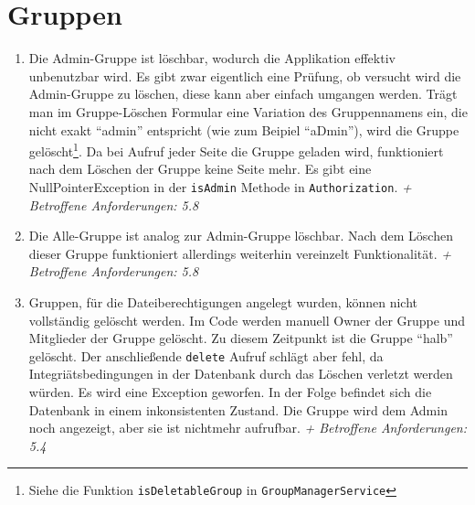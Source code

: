 \documentclass[12pt,DIV14,BCOR10mm,a4paper,parskip=half-,headsepline,headinclude,english,ngerman,bibliography=totocnumbered]{scrreprt}
\begin{document}
\section{Gruppen}
\begin{enumerate}[resume]
\item Die Admin-Gruppe ist löschbar, wodurch die Applikation effektiv unbenutzbar wird. Es gibt zwar eigentlich eine Prüfung, ob versucht wird die Admin-Gruppe zu löschen, diese kann aber einfach umgangen werden. Trägt man im Gruppe-Löschen Formular eine Variation des Gruppennamens ein, die nicht exakt \enquote{admin} entspricht (wie zum Beipiel \enquote{aDmin}), wird die Gruppe gelöscht\footnote{Siehe die Funktion \texttt{isDeletableGroup} in \texttt{GroupManagerService}}. Da bei Aufruf jeder Seite die Gruppe geladen wird, funktioniert nach dem Löschen der Gruppe keine Seite mehr. Es gibt eine NullPointerException in der \texttt{isAdmin} Methode in \texttt{Authorization}.\newline
\textit{+ Betroffene Anforderungen: 5.8}

\item Die Alle-Gruppe ist analog zur Admin-Gruppe löschbar. Nach dem Löschen dieser Gruppe funktioniert allerdings weiterhin vereinzelt Funktionalität.\newline
\textit{+ Betroffene Anforderungen: 5.8}

\item Gruppen, für die Dateiberechtigungen angelegt wurden, können nicht vollständig gelöscht werden. Im Code werden manuell Owner der Gruppe und Mitglieder der Gruppe gelöscht. Zu diesem Zeitpunkt ist die Gruppe \enquote{halb} gelöscht. Der anschließende \texttt{delete} Aufruf schlägt aber fehl, da Integriätsbedingungen in der Datenbank durch das Löschen verletzt werden würden. Es wird eine Exception geworfen. In der Folge befindet sich die Datenbank in einem inkonsistenten Zustand. Die Gruppe wird dem Admin noch angezeigt, aber sie ist nichtmehr aufrufbar.\newline
\textit{+ Betroffene Anforderungen: 5.4}

\end{enumerate}
\end{document}
